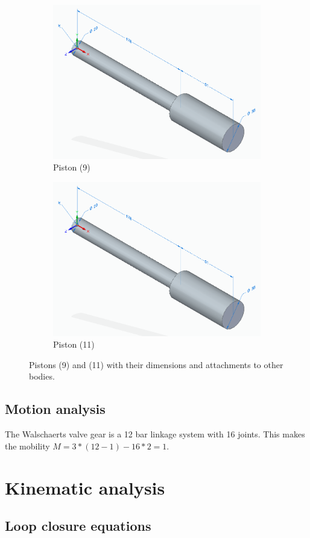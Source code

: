 \documentclass[a4paper]{article}
\begin{document}
\begin{figure}
	\centering
	
	\begin{subfigure}{.5\textwidth}
		\centering
		\caption{Piston (9)}
		\label{fig:piston9}
		\includegraphics[width=.4\textwidth]{piston9.png}
	\end{subfigure}

	\begin{subfigure}{.5\textwidth}
		\centering
		\caption{Piston (11)}
		\label{fig:piston11}
		\includegraphics[width=.4\textwidth]{piston9.png}
	\end{subfigure}

	\caption{Pistons (9) and (11) with their dimensions and attachments to other bodies.}
	\label{fig:pistons}
	
\end{figure}




\subsection{Motion analysis}

The Walschaerts valve gear is a 12 bar linkage system with 16 joints. This makes the mobility \(M=3*(12-1)-16*2=1\).






\section{Kinematic analysis}

\subsection{Loop closure equations}
\end{document}
